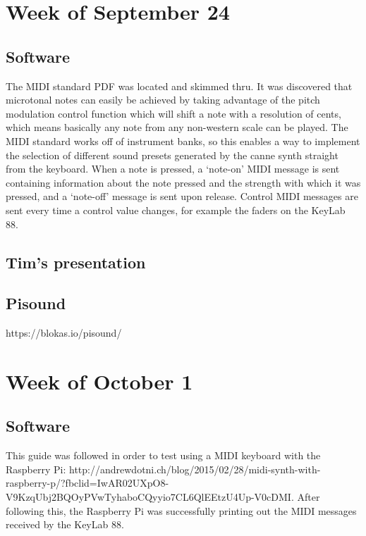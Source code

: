 \documentclass{article}
\begin{document}
\section{Week of September 24}

\subsection{Software}

The MIDI standard PDF was located and skimmed thru. It was discovered that microtonal notes can easily be achieved by taking advantage of the pitch modulation control function which will shift a note with a resolution of cents, which means basically any note from any non-western scale can be played. The MIDI standard works off of instrument banks, so this enables a way to implement the selection of different sound presets generated by the canne synth straight from the keyboard. When a note is pressed, a `note-on' MIDI message is sent containing information about the note pressed and the strength with which it was pressed, and a `note-off' message is sent upon release. Control MIDI messages are sent every time a control value changes, for example the faders on the KeyLab 88.

\subsection{Tim's presentation}

\subsection{Pisound}
https://blokas.io/pisound/



\section{Week of October 1}

\subsection{Software}

This guide was followed in order to test using a MIDI keyboard with the Raspberry Pi: http://andrewdotni.ch/blog/2015/02/28/midi-synth-with-raspberry-p/?fbclid=IwAR02UXpO8-V9KzqUbj2BQOyPVwTyhaboCQyyio7CL6QlEEtzU4Up-V0cDMI. After following this, the Raspberry Pi was successfully printing out the MIDI messages received by the KeyLab 88.
\end{document}
